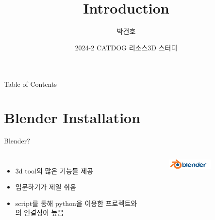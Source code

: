 \documentclass[12pt]{beamer}
\title{Introduction}
\author{박건호}
\date{2024-2 CATDOG 리소스3D 스터디}
\begin{document}
\maketitle
\begin{frame}{Table of Contents}   
\tableofcontents
\end{frame}

\section{Blender Installation}

\begin{frame}{Blender?}
    \begin{columns}
            \begin{itemize}
                \item 3d tool의 많은 기능들 제공 \newline
                \item 입문하기가 제일 쉬움 \newline
                \item script를 통해 python을 이용한 프로젝트와의 연결성이 높음
            \end{itemize}

            \begin{figure}[t]
            \centering
            \includegraphics[width=0.7\textwidth]{image/blender_icon.png}
            \end{figure}
    \end{columns}
\end{frame}
\end{document}
